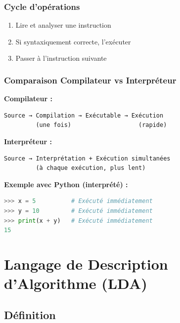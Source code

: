 \documentclass[12pt,a4paper]{article}
\begin{document}
\subsubsection{Cycle d'opérations}

\begin{astuce}
\begin{enumerate}
    \item Lire et analyser une instruction
    \item Si syntaxiquement correcte, l'exécuter
    \item Passer à l'instruction suivante
\end{enumerate}
\end{astuce}

\subsubsection{Comparaison Compilateur vs Interpréteur}

\begin{important}
\textcolor{titrebleu}{\textbf{Compilateur : }}
\begin{verbatim}
Source → Compilation → Exécutable → Exécution
         (une fois)                   (rapide)
\end{verbatim}

\textcolor{defvert}{\textbf{Interpréteur :}}
\begin{verbatim}
Source → Interprétation + Exécution simultanées
         (à chaque exécution, plus lent)
\end{verbatim}
\end{important}

\begin{exemple}
\textbf{Exemple avec Python (interprété) :}
\begin{lstlisting}[language=Python]
>>> x = 5          # Exécuté immédiatement
>>> y = 10         # Exécuté immédiatement
>>> print(x + y)   # Exécuté immédiatement
15
\end{lstlisting}
\end{exemple}

\newpage
\section{Langage de Description d'Algorithme (LDA)}

\subsection{Définition}
\end{document}
